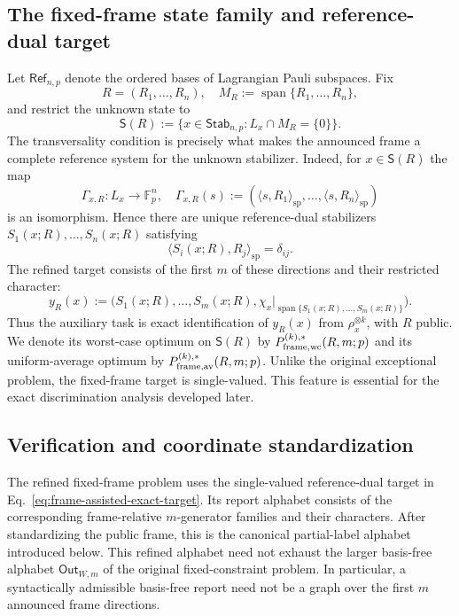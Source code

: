 \documentclass[11pt]{article}
\newcommand{\F}{\mathbb F}
\newcommand{\1}{\mathbf 1}
\newcommand{\spair}[2]{\langle #1,#2\rangle_{\mathrm{sp}}}
\theoremstyle{plain}
\theoremstyle{definition}
\theoremstyle{remark}
\begin{document}
\subsection{The fixed-frame state family and reference-dual target}
\label{subsec:main-results-frame-model}

Let $\mathsf{Ref}_{n,p}$ denote the ordered bases of Lagrangian Pauli
subspaces.  Fix
\begin{equation}
 R=(R_1,\ldots,R_n),\quad
 M_R:=\operatorname{span}\{R_1,\ldots,R_n\},
 \label{eq:announced-reference-frame}
\end{equation}
and restrict the unknown state to
\begin{equation}
 \mathsf S(R):=\{x\in\mathsf{Stab}_{n,p}:L_x\cap M_R=\{0\}\}.
 \label{eq:frame-state-family}
\end{equation}
The transversality condition is precisely what makes the announced frame a
complete reference system for the unknown stabilizer.  Indeed, for
$x\in\mathsf S(R)$ the map
\begin{equation}
 \Gamma_{x,R}:L_x\longrightarrow\F_p^n,\quad
 \Gamma_{x,R}(s):=(\spair{s}{R_1},\ldots,\spair{s}{R_n})
 \label{eq:reference-pairing-map}
\end{equation}
is an isomorphism.  Hence there are unique reference-dual stabilizers
$S_1(x;R),\ldots,S_n(x;R)$ satisfying
\begin{equation}
 \spair{S_i(x;R)}{R_j}=\delta_{ij}.
 \label{eq:reference-dual-family}
\end{equation}
The refined target consists of the first $m$ of these directions and their
restricted character:
\begin{equation}
 y_R(x):=\bigl(S_1(x;R),\ldots,S_m(x;R),
 \chi_x|_{\operatorname{span}\{S_1(x;R),\ldots,S_m(x;R)\}}\bigr).
 \label{eq:frame-assisted-exact-target}
\end{equation}
Thus the auxiliary task is exact identification of $y_R(x)$ from
$\rho_x^{\otimes k}$, with $R$ public.  We denote its worst-case optimum on
$\mathsf S(R)$ by $P_{\rm frame,wc}^{(k),*}(R,m;p)$ and its uniform-average
optimum by $P_{\rm frame,av}^{(k),*}(R,m;p)$.  Unlike the original exceptional
problem, the fixed-frame target is single-valued.  This feature is essential
for the exact discrimination analysis developed later.

\subsection{Verification and coordinate standardization}
The refined fixed-frame problem uses the single-valued reference-dual target
in Eq.~\eqref{eq:frame-assisted-exact-target}.  Its report alphabet consists of
the corresponding frame-relative $m$-generator families and their characters.
After standardizing the public frame, this is the canonical partial-label
alphabet introduced below.  This refined alphabet need not exhaust the larger
basis-free alphabet $\mathsf{Out}_{W,m}$ of the original fixed-constraint
problem.  In particular, a syntactically admissible basis-free report need not
be a graph over the first $m$ announced frame directions.
\end{document}
